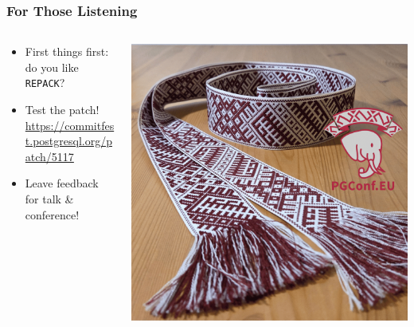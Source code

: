 \begin{frame}
  \frametitle{For Those Listening}
  \begin{columns}[T]
    \begin{column}{0.725\textwidth}
      \begin{itemize}
	\item First things first: do you like \texttt{REPACK}?
	\item Test the patch!
	  \href{https://commitfest.postgresql.org/patch/5117}{https://commitfest.postgresql.org/patch/5117}
	\item Leave feedback for talk \& conference!
      \end{itemize}
    \end{column}
    \begin{column}{0.34\textwidth}
      \includegraphics[height=\textwidth]{belt.png}
    \end{column}
  \end{columns}
\end{frame}
